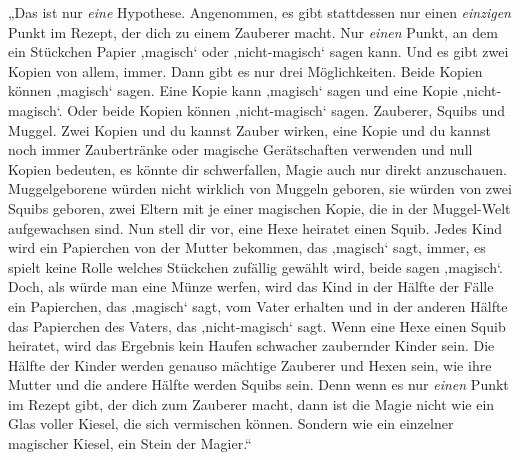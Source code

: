 „Das ist nur \emph{eine} Hypothese. Angenommen, es gibt stattdessen nur einen \emph{einzigen} Punkt im Rezept, der dich zu einem Zauberer macht. Nur \emph{einen} Punkt, an dem ein Stückchen Papier ‚magisch‘ oder ‚nicht-magisch‘ sagen kann. Und es gibt zwei Kopien von allem, immer. Dann gibt es nur drei Möglichkeiten. Beide Kopien können ‚magisch‘ sagen. Eine Kopie kann ‚magisch‘ sagen und eine Kopie ‚nicht-magisch‘. Oder beide Kopien können ‚nicht-magisch‘ sagen. Zauberer, Squibs und Muggel. Zwei Kopien und du kannst Zauber wirken, eine Kopie und du kannst noch immer Zaubertränke oder magische Gerätschaften verwenden und null Kopien bedeuten, es könnte dir schwerfallen, Magie auch nur direkt anzuschauen. Muggelgeborene würden nicht wirklich von Muggeln geboren, sie würden von zwei Squibs geboren, zwei Eltern mit je einer magischen Kopie, die in der Muggel-Welt aufgewachsen sind. Nun stell dir vor, eine Hexe heiratet einen Squib. Jedes Kind wird ein Papierchen von der Mutter bekommen, das ‚magisch‘ sagt, immer, es spielt keine Rolle welches Stückchen zufällig gewählt wird, beide sagen ‚magisch‘. Doch, als würde man eine Münze werfen, wird das Kind in der Hälfte der Fälle ein Papierchen, das ‚magisch‘ sagt, vom Vater erhalten und in der anderen Hälfte das Papierchen des Vaters, das ‚nicht-magisch‘ sagt. Wenn eine Hexe einen Squib heiratet, wird das Ergebnis kein Haufen schwacher zaubernder Kinder sein. Die Hälfte der Kinder werden genauso mächtige Zauberer und Hexen sein, wie ihre Mutter und die andere Hälfte werden Squibs sein. Denn wenn es nur \emph{einen} Punkt im Rezept gibt, der dich zum Zauberer macht, dann ist die Magie nicht wie ein Glas voller Kiesel, die sich vermischen können. Sondern wie ein einzelner magischer Kiesel, ein Stein der Magier.“%

